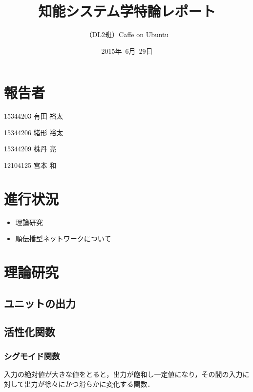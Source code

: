\documentclass[a4paper,10pt]{jsarticle}
\title{知能システム学特論レポート}
\author{
（DL2班）Caffe on Ubuntu\\
}
\date{2015年\ 6月\ 29日}
\begin{document}
\maketitle
\section{報告者}
\begin{list}{}{}
 \item 15344203\hspace{0.5cm} 有田 裕太
 \item 15344206\hspace{0.5cm} 緒形 裕太
 \item 15344209\hspace{0.5cm} 株丹 亮
 \item 12104125\hspace{0.5cm} 宮本 和
\end{list}

\section{進行状況}

\begin{itemize}
\item 理論研究
\item 順伝播型ネットワークについて
\end{itemize}


\section{理論研究}
\subsection{ユニットの出力}

\subsection{活性化関数}
\subsubsection{シグモイド関数}
入力の絶対値が大きな値をとると，出力が飽和し一定値になり，その間の入力に
対して出力が徐々にかつ滑らかに変化する関数．
\end{document}
